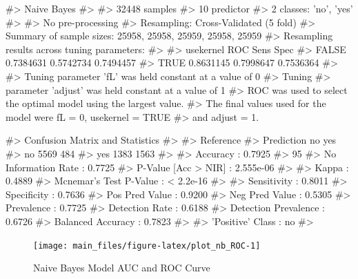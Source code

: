 \begin{Schunk}
\begin{Soutput}
#> Naive Bayes 
#> 
#> 32448 samples
#>    10 predictor
#>     2 classes: 'no', 'yes' 
#> 
#> No pre-processing
#> Resampling: Cross-Validated (5 fold) 
#> Summary of sample sizes: 25958, 25958, 25959, 25958, 25959 
#> Resampling results across tuning parameters:
#> 
#>   usekernel  ROC        Sens       Spec     
#>   FALSE      0.7384631  0.5742734  0.7494457
#>    TRUE      0.8631145  0.7998647  0.7536364
#> 
#> Tuning parameter 'fL' was held constant at a value of 0
#> Tuning
#>  parameter 'adjust' was held constant at a value of 1
#> ROC was used to select the optimal model using the largest value.
#> The final values used for the model were fL = 0, usekernel = TRUE
#>  and adjust = 1.
\end{Soutput}
\end{Schunk}

\begin{Schunk}
\begin{Soutput}
#> Confusion Matrix and Statistics
#> 
#>           Reference
#> Prediction   no  yes
#>        no  5569  484
#>        yes 1383 1563
#>                                          
#>                Accuracy : 0.7925         
#>                  95%
#>     No Information Rate : 0.7725         
#>     P-Value [Acc > NIR] : 2.555e-06      
#>                                          
#>                   Kappa : 0.4889         
#>  Mcnemar's Test P-Value : < 2.2e-16      
#>                                          
#>             Sensitivity : 0.8011         
#>             Specificity : 0.7636         
#>          Pos Pred Value : 0.9200         
#>          Neg Pred Value : 0.5305         
#>              Prevalence : 0.7725         
#>          Detection Rate : 0.6188         
#>    Detection Prevalence : 0.6726         
#>       Balanced Accuracy : 0.7823         
#>                                          
#>        'Positive' Class : no             
#> 
\end{Soutput}
\end{Schunk}

\begin{Schunk}
\begin{figure}[H]

{\centering \texttt{[image: main\_files/figure-latex/plot\_nb\_ROC-1]} 

}

\caption[Naive Bayes Model AUC and ROC Curve]{Naive Bayes Model AUC and ROC Curve}\label{fig:plot_nb_ROC}
\end{figure}
\end{Schunk}

